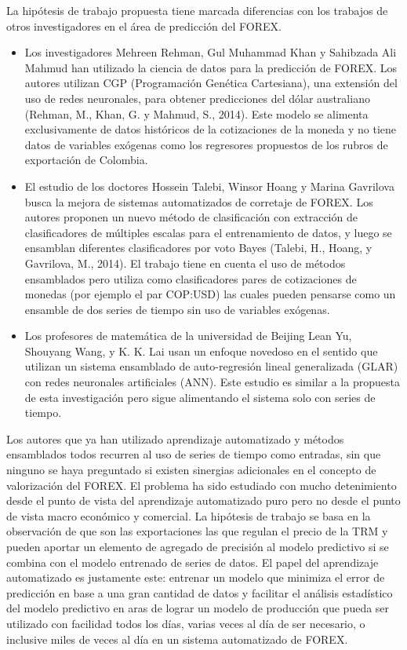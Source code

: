 La hipótesis de trabajo propuesta tiene marcada diferencias con los trabajos de otros investigadores en el área de predicción del FOREX. 

\begin{itemize}
\item Los investigadores Mehreen Rehman, Gul Muhammad Khan y Sahibzada Ali Mahmud han utilizado la ciencia de datos para la predicción de FOREX. Los autores utilizan CGP (Programación Genética Cartesiana), una extensión del uso de redes neuronales, para obtener predicciones del dólar australiano (Rehman, M., Khan, G. y Mahmud, S., 2014). Este modelo se alimenta exclusivamente de datos históricos de la cotizaciones de la moneda y no tiene datos de variables exógenas como los regresores propuestos de los rubros de exportación de Colombia. 
\item El estudio de los doctores Hossein Talebi, Winsor Hoang y Marina Gavrilova busca la mejora de sistemas automatizados de corretaje de FOREX. Los autores proponen un nuevo método de clasificación con extracción de clasificadores de múltiples escalas para el entrenamiento de datos, y luego se ensamblan diferentes clasificadores por voto Bayes (Talebi, H., Hoang, y Gavrilova, M., 2014). El trabajo tiene en cuenta el uso de métodos ensamblados pero utiliza como clasificadores pares de cotizaciones de monedas (por ejemplo el par COP:USD) las cuales pueden pensarse como un ensamble de dos series de tiempo sin uso de variables exógenas. 
\item Los profesores de matemática de la universidad de Beijing Lean Yu, Shouyang Wang, y K. K. Lai usan un enfoque novedoso en el sentido que utilizan un sistema ensamblado de auto-regresión lineal generalizada (GLAR) con redes neuronales artificiales (ANN). Este estudio es similar a la propuesta de esta investigación pero sigue alimentando el sistema solo con series de tiempo.  
\end{itemize}

Los autores que ya han utilizado aprendizaje automatizado y métodos ensamblados todos recurren al uso de series de tiempo como entradas, sin que ninguno se haya preguntado si existen sinergias adicionales en el concepto de valorización del FOREX. El problema ha sido estudiado con mucho detenimiento desde el punto de vista del aprendizaje automatizado puro pero no desde el punto de vista macro económico y comercial. La hipótesis de trabajo se basa en la observación de que son las exportaciones las que regulan el precio de la TRM y pueden aportar un elemento de agregado de precisión al modelo predictivo si se combina con el modelo entrenado de series de datos. El papel del aprendizaje automatizado es justamente este: entrenar un modelo que minimiza el error de predicción en base a una gran cantidad de datos y facilitar el análisis estadístico del modelo predictivo en aras de lograr un modelo de producción que pueda ser utilizado con facilidad todos los días, varias veces al día de ser necesario, o inclusive miles de veces al día en un sistema automatizado de FOREX. 
